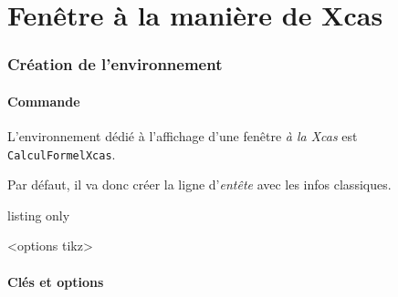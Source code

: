 \documentclass[french,a4paper,11pt]{article}
\begin{document}
\pagebreak

\part{Fenêtre à la manière de Xcas}

\section{Création de l'environnement}

\subsection{Commande}

\begin{cautionblock}
L'environnement dédié à l'affichage d'une fenêtre \textit{à la Xcas} est \texttt{CalculFormelXcas}.

Par défaut, il va donc créer la ligne d'\textit{entête} avec les infos classiques.
\end{cautionblock}

\begin{PresentationCode}{listing only}
\begin{CalculFormelXcas}<options tikz>
\end{CalculFormelXcas}
\end{PresentationCode}

\begin{PresentationCode}{}
\begin{CalculFormelXcas}
\end{CalculFormelXcas}
\end{PresentationCode}

\subsection{Clés et options}
\end{document}
